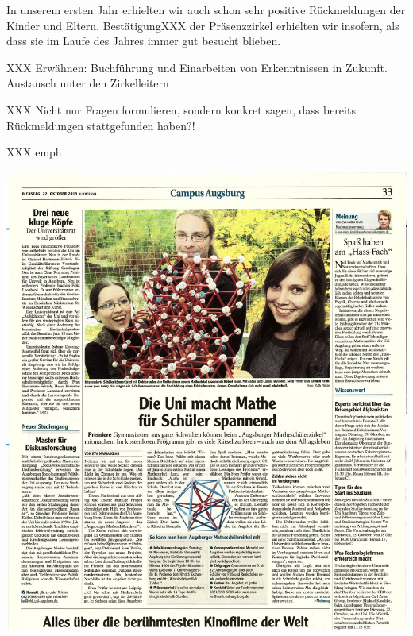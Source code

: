 \documentclass[12pt]{zettel}
\begin{document}
In unserem ersten Jahr erhielten wir auch schon sehr positive Rückmeldungen der
Kinder und Eltern. BestätigungXXX der Präsenzzirkel erhielten wir insofern, als
dass sie im Laufe des Jahres immer gut besucht blieben.

XXX Erwähnen: Buchführung und Einarbeiten von Erkenntnissen in Zukunft.
Austausch unter den Zirkelleitern

XXX Nicht nur Fragen formulieren, sondern konkret sagen, dass bereits
Rückmeldungen stattgefunden haben?!

XXX emph





\pagestyle{empty}
\hspace{-3.5cm}\includegraphics[scale=0.62]{Augsburger-Allgemeine-2013-10-22.jpeg}


\end{document}
